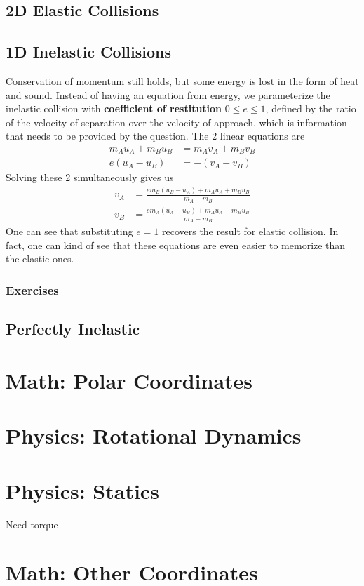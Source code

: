 \documentclass{article}
\begin{document}
\subsection{2D Elastic Collisions}

\subsection{1D Inelastic Collisions}
Conservation of momentum still holds, but some energy is lost in the form of heat and sound. Instead of having an equation from energy, we parameterize the inelastic collision with \textbf{coefficient of restitution} $0\leq e \leq 1$, defined by the ratio of the velocity of separation over the velocity of approach, which is information that needs to be provided by the question. The 2 linear equations are 
\begin{align}
    m_A u_A + m_B u_B &= m_A v_A + m_B v_B \\
    e (u_A - u_B) &= -(v_A - v_B)
\end{align}
Solving these 2 simultaneously gives us
\begin{align}
    v_A &= \frac{e m_B (u_B - u_A) + m_A u_A + m_B u_B}{m_A + m_B} \\
    v_B &= \frac{e m_A (u_A - u_B) + m_A u_A + m_B u_B}{m_A + m_B}
\end{align}
One can see that substituting $e=1$ recovers the result for elastic collision. In fact, one can kind of see that these equations are even easier to memorize than the elastic ones. 
\subsubsection{Exercises}
\subsection{Perfectly Inelastic}

\section{Math: Polar Coordinates}
\section{Physics: Rotational Dynamics}
\section{Physics: Statics}
Need torque
\section{Math: Other Coordinates}
\end{document}
